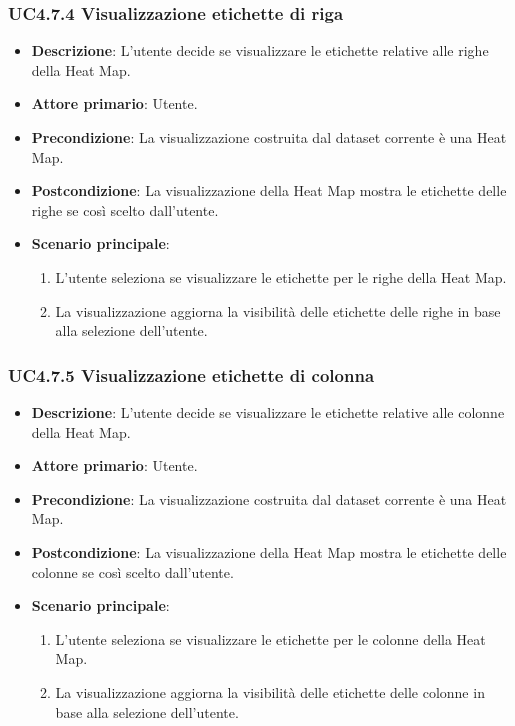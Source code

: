 \subsubsection{UC4.7.4 Visualizzazione etichette di riga}
\label{ssub:uc4.7.4}
\begin{itemize}
    \item \textbf{Descrizione}: L’utente decide se visualizzare le etichette relative alle righe della Heat Map.

    \item \textbf{Attore primario}: Utente.
    
    \item \textbf{Precondizione}:   La visualizzazione costruita dal dataset corrente è una Heat Map.
    \item \textbf{Postcondizione}:  La visualizzazione della Heat Map mostra le etichette delle righe se così scelto dall'utente.

	\item \textbf{Scenario principale}:
        \begin{enumerate}
            \item   L'utente seleziona se visualizzare le etichette per le righe della Heat Map.
            \item   La visualizzazione aggiorna la visibilità delle etichette delle righe in base alla selezione dell'utente.
                    
        \end{enumerate}
\end{itemize}



\subsubsection{UC4.7.5 Visualizzazione etichette di colonna}
\label{ssub:uc4.7.5}
\begin{itemize}
    \item \textbf{Descrizione}: L’utente decide se visualizzare le etichette relative alle colonne della Heat Map.

    \item \textbf{Attore primario}: Utente.
    
    \item \textbf{Precondizione}:   La visualizzazione costruita dal dataset corrente è una Heat Map.
    \item \textbf{Postcondizione}:  La visualizzazione della Heat Map mostra le etichette delle colonne se così scelto dall'utente.

	\item \textbf{Scenario principale}:
        \begin{enumerate}
            \item   L'utente seleziona se visualizzare le etichette per le colonne della Heat Map.
            \item   La visualizzazione aggiorna la visibilità delle etichette delle colonne in base alla selezione dell'utente.
                    
        \end{enumerate}
\end{itemize}


